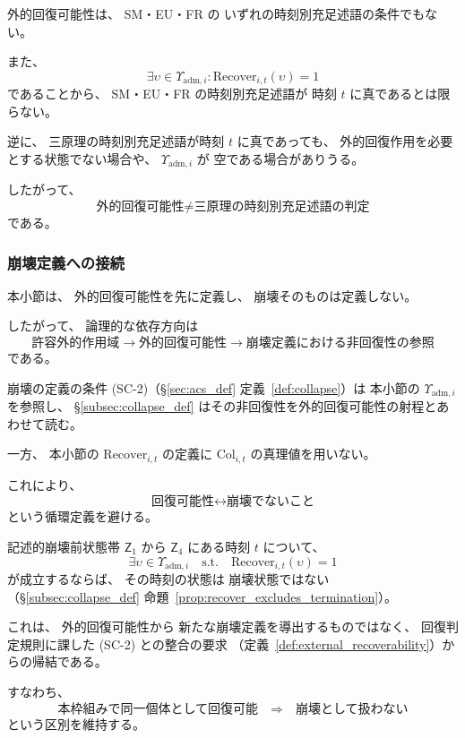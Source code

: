 \begin{remark}[外的回復可能性と三原理の時刻別充足述語]
\label{rem:recovery_not_principle_truth}
外的回復可能性は、
SM・EU・FR の
いずれの時刻別充足述語の条件でもない。

また、
\[
  \exists\upsilon\in\Upsilon_{\mathrm{adm},i}:
  \mathrm{Recover}_{i,t}(\upsilon)=1
\]
であることから、
SM・EU・FR の時刻別充足述語が
時刻 $t$ に真であるとは限らない。

逆に、
三原理の時刻別充足述語が時刻 $t$ に真であっても、
外的回復作用を必要とする状態でない場合や、
$\Upsilon_{\mathrm{adm},i}$ が
空である場合がありうる。

したがって、
\[
  \text{外的回復可能性}
  \neq
  \text{三原理の時刻別充足述語の判定}
\]
である。
\end{remark}

\subsubsection{崩壊定義への接続}

\begin{remark}[外的回復可能性と崩壊の依存方向]
\label{rem:recovery_collapse_distinction}
本小節は、
外的回復可能性を先に定義し、
崩壊そのものは定義しない。

したがって、
論理的な依存方向は
\[
  \text{許容外的作用域}
  \longrightarrow
  \text{外的回復可能性}
  \longrightarrow
  \text{崩壊定義における非回復性の参照}
\]
である。

崩壊の定義の条件 (SC-2)（\S\ref{sec:acs_def} 定義~\ref{def:collapse}）は
本小節の
$\Upsilon_{\mathrm{adm},i}$
を参照し、
\S\ref{subsec:collapse_def}
はその非回復性を外的回復可能性の射程とあわせて読む。

一方、
本小節の
$\mathrm{Recover}_{i,t}$
の定義に
$\mathrm{Col}_{i,t}$
の真理値を用いない。

これにより、
\[
  \text{回復可能性}
  \leftrightarrow
  \text{崩壊でないこと}
\]
という循環定義を避ける。
\end{remark}

\begin{remark}[回復可能なら崩壊ではない]
\label{rem:recoverable_excludes_collapse}
記述的崩壊前状態帯
$\mathsf{Z}_1$ から
$\mathsf{Z}_4$ にある時刻 $t$ について、
\[
  \exists\upsilon\in\Upsilon_{\mathrm{adm},i}
  \quad\text{s.t.}\quad
  \mathrm{Recover}_{i,t}(\upsilon)=1
\]
が成立するならば、
その時刻の状態は
崩壊状態ではない
（\S\ref{subsec:collapse_def} 命題~\ref{prop:recover_excludes_termination}）。

これは、
外的回復可能性から
新たな崩壊定義を導出するものではなく、
回復判定規則に課した (SC-2) との整合の要求
（定義~\ref{def:external_recoverability}）からの帰結である。

すなわち、
\[
  \text{本枠組みで同一個体として回復可能}
  \quad\Rightarrow\quad
  \text{崩壊として扱わない}
\]
という区別を維持する。
\end{remark}

